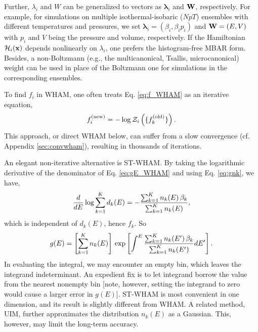 \documentclass[reprint,aip,jcp,superscriptaddress]{revtex4-1}
\begin{document}
Further,
$\lambda_i$ and $W$
can be generalized
to vectors as
$\bm{\lambda}_i$
and
$\mathbf{W}$, respectively.
%
For example,
for simulations
on multiple isothermal-isobaric ($NpT$) ensembles
with different temperatures and pressures,
%
we set
$\bm{\lambda}_i = (\beta_i, \beta_i p_i)$
and
$\mathbf{W} = (E, V)$
with
$p_i$ and $V$
being the pressure and volume,
respectively.
%
If the Hamiltonian $\mathcal{H}_i(\mathbf{x})$
depends nonlinearly on $\lambda_i$,
one prefers the histogram-free MBAR form\cite{
shirts2008}.
%
Besides,
a non-Boltzmann
(e.g., the multicanonical\cite{
mezei1987, *berg1992, *lee1993},
Tsallis\cite{tsallis1988},
microcanonical\cite{
yan2003, *martin-mayor2007, *zhang2013})
weight
can be used in place of the Boltzmann one
for simulations in the corresponding ensembles.
%



To find $f_i$ in WHAM,
one often treats Eq. \eqref{eq:f_WHAM}
as an iterative equation,
%
\begin{equation*}
f_i^\mathrm{(new)}
=
-\log \mathcal{Z}_i\left(
  \{ f_k^\mathrm{(old)} \}
\right).
\end{equation*}
%
This approach, or direct WHAM below,
can suffer from a slow convergence
(cf. Appendix \ref{sec:convwham}),
resulting in thousands of iterations\cite{
bereau2009, kim2011, zhu2012}.



An elegant non-iterative alternative is ST-WHAM\cite{
kim2011}.
%
By taking the logarithmic derivative of
the denominator of Eq. \eqref{eq:gE_WHAM}
and using Eq. \eqref{eq:gnk},
we have,
%
\begin{align}
\frac{d}{dE}
\log
  \sum_{k = 1}^K d_k(E)
=
-
\frac{
  \sum_{k = 1}^K n_k(E) \, \beta_k
}
{
  \sum_{k = 1}^K n_k(E)
},
\notag
\end{align}
%
which is independent of $d_k(E)$, hence $f_k$.
%
So
\begin{align}
g(E)
=
\left[
  \sum_{k = 1}^K n_k(E)
\right]
\,
\exp
\left[
\int^E
    \frac{ \sum_{k = 1}^K n_k(E') \, \beta_k }
         { \sum_{k = 1}^K n_k(E') }
  dE'
\right].
\notag
\end{align}
%
In evaluating the integral,
we may encounter an empty bin,
which leaves the integrand indeterminant.
%
An expedient fix is to let integrand borrow
the value from the nearest nonempty bin
%
[note, however, setting the integrand to zero
would cause a larger error in $g(E)$].
%
ST-WHAM is most convenient in one dimension,
and its result is slightly different from WHAM\cite{kim2011}.
%
A related method, UIM\cite{
kastner2005, *kastner2009},
further approximates
the distribution $n_k(E)$ as a Gaussian.
%
This, however, may limit the long-term accuracy.
\end{document}
